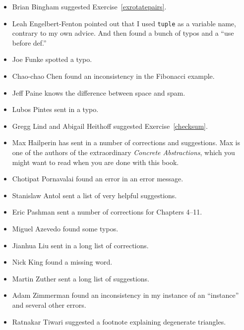 \begin{itemize}
\item Brian Bingham suggested Exercise~\ref{exrotatepairs}.

\item Leah Engelbert-Fenton pointed out that I used {\tt tuple}
as a variable name, contrary to my own advice.  And then found
a bunch of typos and a ``use before def.''

\item Joe Funke spotted a typo.

\item Chao-chao Chen found an inconsistency in the Fibonacci example.

\item Jeff Paine knows the difference between space and spam.

\item Lubos Pintes sent in a typo.

\item Gregg Lind and Abigail Heithoff suggested Exercise~\ref{checksum}.

\item Max Hailperin has sent in a number of corrections and
  suggestions.  Max is one of the authors of the extraordinary {\em
    Concrete Abstractions}, which you might want to read when you are
  done with this book.

\item Chotipat Pornavalai found an error in an error message.

\item Stanislaw Antol sent a list of very helpful suggestions.

\item Eric Pashman sent a number of corrections for Chapters 4--11.

\item Miguel Azevedo found some typos.

\item Jianhua Liu sent in a long list of corrections.

\item Nick King found a missing word.

\item Martin Zuther sent a long list of suggestions.

\item Adam Zimmerman found an inconsistency in my instance
of an ``instance'' and several other errors.

\item Ratnakar Tiwari suggested a footnote explaining degenerate
triangles.


\end{itemize}

